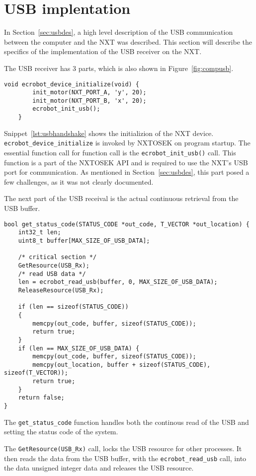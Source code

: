 \section{USB implentation}
\label{sec:usbimp}
In Section~\ref{sec:usbdes}, a high level description of the USB communication between the computer and the NXT was described.
This section will describe the specifics of the implementation of the USB receiver on the NXT.

The USB receiver has 3 parts, which is also shown in Figure~\ref{fig:compusb}.

\begin{lstlisting}[language=CSharp,label={lst:usbhandshake},caption={ecrobot\_device\_initialize method from nxt.c}]
    void ecrobot_device_initialize(void) {
        init_motor(NXT_PORT_A, 'y', 20);
        init_motor(NXT_PORT_B, 'x', 20);
        ecrobot_init_usb();
    }
\end{lstlisting}
Snippet~\ref{lst:usbhandshake} shows the initializion of the NXT device.
\texttt{ecrobot\_device\_initialize} is invoked by NXTOSEK on program startup.
The essential function call for function call is the \texttt{ecrobot\_init\_usb()} call.
This function is a part of the NXTOSEK API and is required to use the NXT's USB port for communication.
As mentioned in Section~\ref{sec:usbdes}, this part posed a few challenges, as it was not clearly documented.

The next part of the USB receival is the actual continuous retrieval from the USB buffer.
\begin{lstlisting}[language=CSharp,label={lst:usbreceive},caption={get\_status\_code method from usb.c}]
bool get_status_code(STATUS_CODE *out_code, T_VECTOR *out_location) {
	int32_t len;
	uint8_t buffer[MAX_SIZE_OF_USB_DATA];

	/* critical section */
	GetResource(USB_Rx);
	/* read USB data */
	len = ecrobot_read_usb(buffer, 0, MAX_SIZE_OF_USB_DATA);
	ReleaseResource(USB_Rx);

	if (len == sizeof(STATUS_CODE))
	{
		memcpy(out_code, buffer, sizeof(STATUS_CODE));
		return true;
	}
	if (len == MAX_SIZE_OF_USB_DATA) {
		memcpy(out_code, buffer, sizeof(STATUS_CODE));
		memcpy(out_location, buffer + sizeof(STATUS_CODE), sizeof(T_VECTOR));
		return true;
	}
	return false;
}
\end{lstlisting}
The \texttt{get\_status\_code} function handles both the continous read of the USB and setting the status code of the system.

The \texttt{GetResource(USB\_Rx)} call, locks the USB resource for other processes.
It then reads the data from the USB buffer, with the \texttt{ecrobot\_read\_usb} call, into the data unsigned integer data and releases the USB resource.

